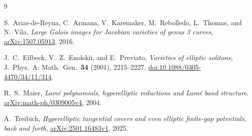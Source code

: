 \documentclass{amsart}
\begin{document}
\begin{thebibliography}{9}
\raggedright
{}
S.~Arias-de-Reyna, C.~Armana, V.~Karemaker, M.~Rebolledo,
L.~Thomas, and N.~Vila,
\emph{Large Galois images for Jacobian varieties of genus 3 curves},
\href{https://arxiv.org/abs/1507.05913}{arXiv:1507.05913}, 2016.

J.~C.~Eilbeck, V.~Z.~Enolskii, and E.~Previato,
\emph{Varieties of elliptic solitons},
J.\ Phys.\ A: Math.\ Gen.\ \textbf{34} (2001), 2215--2227,
\href{https://doi.org/10.1088/0305-4470/34/11/314}{doi:10.1088/0305-4470/34/11/314}.

R.~S.~Maier,
\emph{Lam\'e polynomials, hyperelliptic reductions and Lam\'e band structure},
\href{https://arxiv.org/abs/math-ph/0309005v4}{arXiv:math-ph/0309005v4}, 2004.

A.~Treibich,
\emph{Hyperelliptic tangential covers and even elliptic finite-gap
potentials, back and forth},
\href{https://arxiv.org/abs/2501.16483v1}{arXiv:2501.16483v1}, 2025.
\end{thebibliography}
\end{document}
